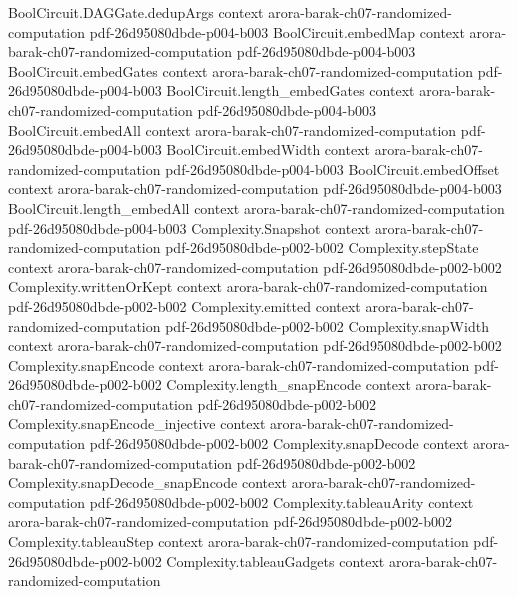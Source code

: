 \begin{theorem}
  {BoolCircuit.DAGGate.dedupArgs}
  {context}
  {arora-barak-ch07-randomized-computation}
  {pdf-26d95080dbde-p004-b003}
\proofstep
  {BoolCircuit.embedMap}
  {context}
  {arora-barak-ch07-randomized-computation}
  {pdf-26d95080dbde-p004-b003}
\proofstep
  {BoolCircuit.embedGates}
  {context}
  {arora-barak-ch07-randomized-computation}
  {pdf-26d95080dbde-p004-b003}
\proofstep
  {BoolCircuit.length_embedGates}
  {context}
  {arora-barak-ch07-randomized-computation}
  {pdf-26d95080dbde-p004-b003}
\proofstep
  {BoolCircuit.embedAll}
  {context}
  {arora-barak-ch07-randomized-computation}
  {pdf-26d95080dbde-p004-b003}
\proofstep
  {BoolCircuit.embedWidth}
  {context}
  {arora-barak-ch07-randomized-computation}
  {pdf-26d95080dbde-p004-b003}
\proofstep
  {BoolCircuit.embedOffset}
  {context}
  {arora-barak-ch07-randomized-computation}
  {pdf-26d95080dbde-p004-b003}
\proofstep
  {BoolCircuit.length_embedAll}
  {context}
  {arora-barak-ch07-randomized-computation}
  {pdf-26d95080dbde-p004-b003}
\proofstep
  {Complexity.Snapshot}
  {context}
  {arora-barak-ch07-randomized-computation}
  {pdf-26d95080dbde-p002-b002}
\proofstep
  {Complexity.stepState}
  {context}
  {arora-barak-ch07-randomized-computation}
  {pdf-26d95080dbde-p002-b002}
\proofstep
  {Complexity.writtenOrKept}
  {context}
  {arora-barak-ch07-randomized-computation}
  {pdf-26d95080dbde-p002-b002}
\proofstep
  {Complexity.emitted}
  {context}
  {arora-barak-ch07-randomized-computation}
  {pdf-26d95080dbde-p002-b002}
\proofstep
  {Complexity.snapWidth}
  {context}
  {arora-barak-ch07-randomized-computation}
  {pdf-26d95080dbde-p002-b002}
\proofstep
  {Complexity.snapEncode}
  {context}
  {arora-barak-ch07-randomized-computation}
  {pdf-26d95080dbde-p002-b002}
\proofstep
  {Complexity.length_snapEncode}
  {context}
  {arora-barak-ch07-randomized-computation}
  {pdf-26d95080dbde-p002-b002}
\proofstep
  {Complexity.snapEncode_injective}
  {context}
  {arora-barak-ch07-randomized-computation}
  {pdf-26d95080dbde-p002-b002}
\proofstep
  {Complexity.snapDecode}
  {context}
  {arora-barak-ch07-randomized-computation}
  {pdf-26d95080dbde-p002-b002}
\proofstep
  {Complexity.snapDecode_snapEncode}
  {context}
  {arora-barak-ch07-randomized-computation}
  {pdf-26d95080dbde-p002-b002}
\proofstep
  {Complexity.tableauArity}
  {context}
  {arora-barak-ch07-randomized-computation}
  {pdf-26d95080dbde-p002-b002}
\proofstep
  {Complexity.tableauStep}
  {context}
  {arora-barak-ch07-randomized-computation}
  {pdf-26d95080dbde-p002-b002}
\proofstep
  {Complexity.tableauGadgets}
  {context}
  {arora-barak-ch07-randomized-computation}

\end{theorem}
